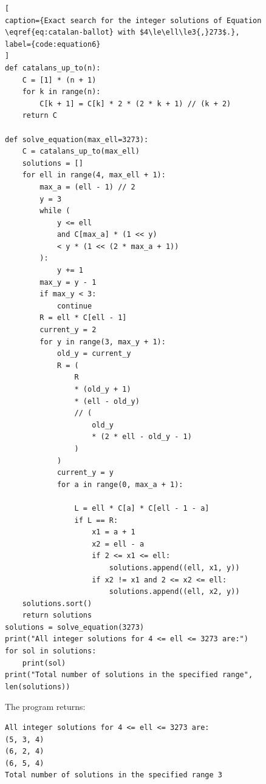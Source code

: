 \documentclass[11pt]{article}
\begin{document}
\begin{lstlisting}[
caption={Exact search for the integer solutions of Equation \eqref{eq:catalan-ballot} with $4\le\ell\le3{,}273$.},
label={code:equation6}
]
def catalans_up_to(n):
    C = [1] * (n + 1)
    for k in range(n):
        C[k + 1] = C[k] * 2 * (2 * k + 1) // (k + 2)
    return C

def solve_equation(max_ell=3273):
    C = catalans_up_to(max_ell)
    solutions = []
    for ell in range(4, max_ell + 1):
        max_a = (ell - 1) // 2
        y = 3
        while (
            y <= ell
            and C[max_a] * (1 << y)
            < y * (1 << (2 * max_a + 1))
        ):
            y += 1
        max_y = y - 1
        if max_y < 3:
            continue      
        R = ell * C[ell - 1]
        current_y = 2
        for y in range(3, max_y + 1):
            old_y = current_y
            R = (
                R
                * (old_y + 1)
                * (ell - old_y)
                // (
                    old_y
                    * (2 * ell - old_y - 1)
                )
            )
            current_y = y
            for a in range(0, max_a + 1):

                L = ell * C[a] * C[ell - 1 - a]
                if L == R:
                    x1 = a + 1
                    x2 = ell - a
                    if 2 <= x1 <= ell:
                        solutions.append((ell, x1, y))
                    if x2 != x1 and 2 <= x2 <= ell:
                        solutions.append((ell, x2, y))
    solutions.sort()
    return solutions
solutions = solve_equation(3273)
print("All integer solutions for 4 <= ell <= 3273 are:")
for sol in solutions:
    print(sol)
print("Total number of solutions in the specified range", len(solutions))
\end{lstlisting}

The program returns:

\begin{verbatim}
All integer solutions for 4 <= ell <= 3273 are:
(5, 3, 4)
(6, 2, 4)
(6, 5, 4)
Total number of solutions in the specified range 3
\end{verbatim}
\end{document}

